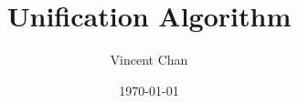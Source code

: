 \documentclass[t]{beamer}
\begin{document}
    \author{Vincent Chan}
    \title{Unification Algorithm}
    \date{\today}


    \begin{frame}
        \titlepage
    \end{frame}


    
\end{document}
